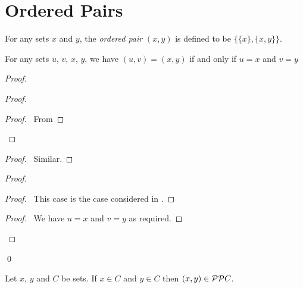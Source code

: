 \section{Ordered Pairs}

\begin{definition}
    For any sets $x$ and $y$, the \emph{ordered pair} $(x,y)$ is defined to be $\{ \{ x \}, \{ x , y \} \}$.    
\end{definition}

\begin{theorem}
    For any sets $u$, $v$, $x$, $y$, we have $(u,v) = (x,y)$ if and only if $u = x$ and $v = y$
\end{theorem}

\begin{proof}
    \pf
    \begin{proof}
        \begin{proof}
            \pf\ From 
        \end{proof}
    \end{proof}
    \begin{proof}
        \pf\ Similar.
    \end{proof}
    \begin{proof}
        \begin{proof}
            \pf\ This case is the case considered in .
        \end{proof}
        \begin{proof}
            \pf\ We have $u = x$ and $v = y$ as required.
        \end{proof}
    \end{proof}
    \qed
\end{proof}

\begin{lemma}
    \label{lemma:ordered_pair_pow_pow}
    Let $x$, $y$ and $C$ be sets. If $x \in C$ and $y \in C$ then $(x,y) \in \mathcal{P} \mathcal{P} C$.
\end{lemma}


